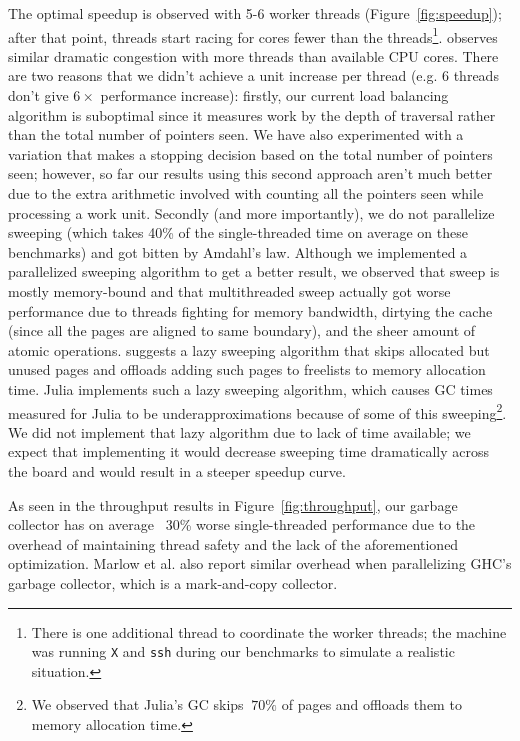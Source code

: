 The optimal speedup is observed with 5-6 worker threads (Figure~\ref{fig:speedup}); after that point, threads start racing for cores fewer than the threads\footnote{There is one additional thread to coordinate the worker threads; the machine was running \texttt{X} and \texttt{ssh} during our benchmarks to simulate a realistic situation.}.
\cite{marlow2011multicore} observes similar dramatic congestion with more threads than available CPU cores.
There are two reasons that we didn't achieve a unit increase per thread (e.g. 6 threads don't give $6\times$ performance increase):
firstly, our current load balancing algorithm is suboptimal since it measures work by the depth of traversal rather than the total number of pointers seen.
We have also experimented with a variation that makes a stopping decision based on the total number of pointers seen; however, so far our results using this second approach aren't much better due to the extra arithmetic involved with counting all the pointers seen while processing a work unit.
Secondly (and more importantly), we do not parallelize sweeping (which takes 40\% of the single-threaded time on average on these benchmarks) and got bitten by Amdahl's law.
Although we implemented a parallelized sweeping algorithm to get a better result, we observed that sweep is mostly memory-bound and that multithreaded sweep actually got worse performance due to threads fighting for memory bandwidth, dirtying the cache (since all the pages are aligned to same boundary), and the sheer amount of atomic operations.
\cite{boehm1991mostly} suggests a lazy sweeping algorithm that skips allocated but unused pages and offloads adding such pages to freelists to memory allocation time.
Julia implements such a lazy sweeping algorithm, which causes GC times measured for Julia to be underapproximations because of some of this sweeping\footnote{We observed that Julia's GC skips $~70\%$ of pages and offloads them to memory allocation time.}.
We did not implement that lazy algorithm due to lack of time available; we expect that implementing it would decrease sweeping time dramatically across the board and would result in a steeper speedup curve.

As seen in the throughput results in Figure~\ref{fig:throughput}, our garbage collector has on average ~30\% worse single-threaded performance due to the overhead of maintaining thread safety and the lack of the aforementioned optimization.
Marlow et al. \cite{marlow2008parallel} also report similar overhead when parallelizing GHC's garbage collector, which is a mark-and-copy collector.

